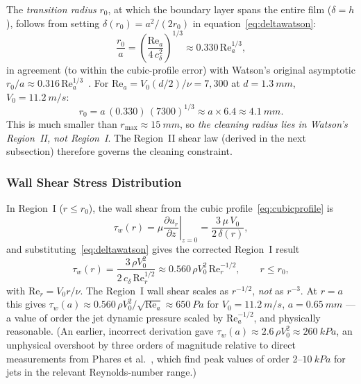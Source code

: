 \documentclass[10pt,letterpaper]{article}
\newcommand{\Rey}{\mathrm{Re}}
\begin{document}
The \emph{transition radius} $r_0$, at which the boundary layer spans the
entire film ($\delta = h$), follows from setting $\delta(r_0) = a^2/(2 r_0)$
in equation~\eqref{eq:deltawatson}:
\begin{equation}
    \frac{r_0}{a} = \left(\frac{\Rey_a}{4\,c_\delta^2}\right)^{1/3}
    \approx 0.330\,\Rey_a^{1/3},
    \label{eq:r0}
\end{equation}
in agreement (to within the cubic-profile error) with Watson's original
asymptotic $r_0/a \approx 0.316\,\Rey_a^{1/3}$~\citep{Watson1964}. For
$\Rey_a = V_0(d/2)/\nu = 7{,}300$ at $d = 1.3~mm$, $V_0 = 11.2~m/s$:
\begin{equation}
    r_0 = a\,(0.330)\,(7300)^{1/3} \approx a \times 6.4
    \approx 4.1~mm.
\end{equation}
This is much smaller than $r_\mathrm{max} \approx 15~mm$, so
\emph{the cleaning radius lies in Watson's Region~II, not Region~I}.
The Region~II shear law (derived in the next subsection) therefore
governs the cleaning constraint.

\subsubsection{Wall Shear Stress Distribution}

In Region~I ($r \leq r_0$), the wall shear from the cubic
profile~\eqref{eq:cubicprofile} is
\begin{equation}
    \tau_w(r) = \mu\left.\frac{\partial u_r}{\partial z}\right|_{z=0}
    = \frac{3\,\mu\,V_0}{2\,\delta(r)},
    \label{eq:taudef}
\end{equation}
and substituting~\eqref{eq:deltawatson} gives the corrected Region~I result
\begin{equation}
    \boxed{
    \tau_w(r) = \frac{3\,\rho V_0^2}{2\,c_\delta\,\Rey_r^{1/2}}
    \approx 0.560\,\rho V_0^2\,\Rey_r^{-1/2},
    \qquad r \leq r_0,
    }
    \label{eq:tauI}
\end{equation}
with $\Rey_r = V_0 r/\nu$. The Region~I wall shear scales as $r^{-1/2}$,
\emph{not} as $r^{-3}$. At $r = a$ this gives
$\tau_w(a) \approx 0.560\,\rho V_0^2/\sqrt{\Rey_a} \approx 650~Pa$
for $V_0 = 11.2~m/s$, $a = 0.65~mm$ --- a value of order the
jet dynamic pressure scaled by $\Rey_a^{-1/2}$, and physically
reasonable. (An earlier, incorrect derivation gave
$\tau_w(a) \approx 2.6\,\rho V_0^2 \approx 260~kPa$, an unphysical
overshoot by three orders of magnitude relative to direct measurements
from Phares et al.~\citep{Phares2000}, which find peak values of order
2--$10~kPa$ for jets in the relevant Reynolds-number range.)
\end{document}
